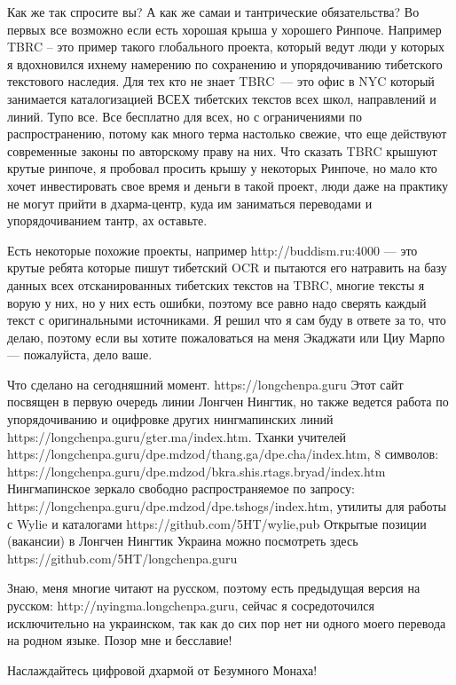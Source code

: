 Как же так спросите вы? А как же самаи и тантрические обязательства? Во первых все возможно если есть хорошая крыша у хорошего Ринпоче. Например TBRC – это пример такого глобального проекта, который ведут люди у которых я вдохновился ихнему намерению по сохранению и упорядочиванию тибетского текстового наследия. Для тех кто не знает TBRC — это офис в NYC который занимается каталогизацией ВСЕХ тибетских текстов всех школ, направлений и линий. Тупо все. Все бесплатно для всех, но с ограничениями по распространению, потому как много терма настолько свежие, что еще действуют современные законы по авторскому праву на них. Что сказать TBRC крышуют крутые ринпоче, я пробовал просить крышу у некоторых Ринпоче, но мало кто хочет инвестировать свое время и деньги в такой проект, люди даже на практику не могут прийти в дхарма-центр, куда им заниматься переводами и упорядочиванием тантр, ах оставьте.

Есть некоторые похожие проекты, например http://buddism.ru:4000 — это крутые ребята которые пишут тибетский OCR и пытаются его натравить на базу данных всех отсканированных тибетских текстов на TBRC, многие тексты я ворую у них, но у них есть ошибки, поэтому все равно надо сверять каждый текст с оригинальными источниками. Я решил что я сам буду в ответе за то, что делаю, поэтому если вы хотите пожаловаться на меня Экаджати или Циу Марпо — пожалуйста, дело ваше.

Что сделано на сегодняшний момент. https://longchenpa.guru Этот сайт посвящен в первую очередь линии Лонгчен Нингтик, но также ведется работа по упорядочиванию и оцифровке других нингмапинских линий https://longchenpa.guru/gter.ma/index.htm. Тханки учителей https://longchenpa.guru/dpe.mdzod/thang.ga/dpe.cha/index.htm, 8 символов: https://longchenpa.guru/dpe.mdzod/bkra.shis.rtags.bryad/index.htm Нингмапинское зеркало свободно распространяемое по запросу: https://longchenpa.guru/dpe.mdzod/dpe.tshogs/index.htm, утилиты для работы с Wylie  и каталогами https://github.com/5HT/{wylie,pub} Открытые позиции (вакансии) в Лонгчен Нингтик Украина можно посмотреть здесь https://github.com/5HT/longchenpa.guru

Знаю, меня многие читают на русском, поэтому есть предыдущая версия на русском: http://nyingma.longchenpa.guru, сейчас я сосредоточился исключительно на украинском, так как до сих пор нет ни одного моего перевода на родном языке. Позор мне и бесславие!

Наслаждайтесь цифровой дхармой от Безумного Монаха!
